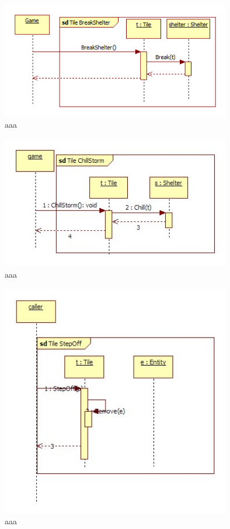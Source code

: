 \begin{figure}[H]
        \begin{center}
                \includegraphics[width=10cm]{chapters/chapter07/seqdiag/Tile_BreakShelter.png}
                \caption{aaa}
                \label{bbb}
        \end{center}
\end{figure}
\begin{figure}[H]
        \begin{center}
                \includegraphics[width=10cm]{chapters/chapter07/seqdiag/Tile_ChillStorm.jpg}
                \caption{aaa}
                \label{bbb}
        \end{center}
\end{figure}
\begin{figure}[H]
        \begin{center}
                \includegraphics[width=10cm]{chapters/chapter07/seqdiag/Tile_StepOff.jpg}
                \caption{aaa}
                \label{bbb}
        \end{center}
\end{figure}
